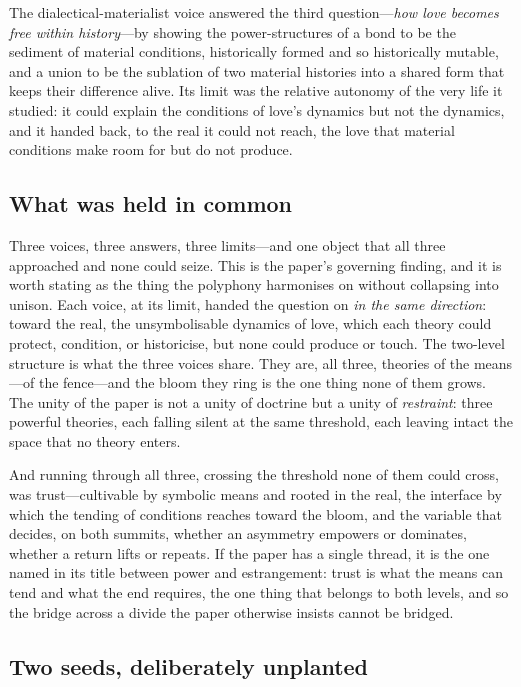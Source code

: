 The dialectical-materialist voice answered the third question---\emph{how love becomes free within history}---by showing the power-structures of a bond to be the sediment of material conditions, historically formed and so historically mutable, and a union to be the sublation of two material histories into a shared form that keeps their difference alive. Its limit was the relative autonomy of the very life it studied: it could explain the conditions of love's dynamics but not the dynamics, and it handed back, to the real it could not reach, the love that material conditions make room for but do not produce.

\subsection{What was held in common}
\label{p17:sub:concl-common}

Three voices, three answers, three limits---and one object that all three approached and none could seize. This is the paper's governing finding, and it is worth stating as the thing the polyphony harmonises on without collapsing into unison. Each voice, at its limit, handed the question on \emph{in the same direction}: toward the real, the unsymbolisable dynamics of love, which each theory could protect, condition, or historicise, but none could produce or touch. The two-level structure is what the three voices share. They are, all three, theories of the means---of the fence---and the bloom they ring is the one thing none of them grows. The unity of the paper is not a unity of doctrine but a unity of \emph{restraint}: three powerful theories, each falling silent at the same threshold, each leaving intact the space that no theory enters.

And running through all three, crossing the threshold none of them could cross, was trust---cultivable by symbolic means and rooted in the real, the interface by which the tending of conditions reaches toward the bloom, and the variable that decides, on both summits, whether an asymmetry empowers or dominates, whether a return lifts or repeats. If the paper has a single thread, it is the one named in its title between power and estrangement: trust is what the means can tend and what the end requires, the one thing that belongs to both levels, and so the bridge across a divide the paper otherwise insists cannot be bridged.

\subsection{Two seeds, deliberately unplanted}
\label{p17:sub:concl-seeds}

